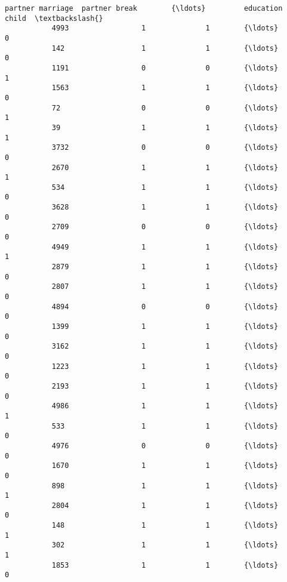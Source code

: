 \documentclass[11pt]{article}
\begin{document}
\begin{Verbatim}[commandchars=\\\{\}]
                 partner marriage  partner break        {\ldots}         education child  \textbackslash{}
           4993                 1              1        {\ldots}                       0   
           142                  1              1        {\ldots}                       0   
           1191                 0              0        {\ldots}                       1   
           1563                 1              1        {\ldots}                       0   
           72                   0              0        {\ldots}                       1   
           39                   1              1        {\ldots}                       1   
           3732                 0              0        {\ldots}                       0   
           2670                 1              1        {\ldots}                       1   
           534                  1              1        {\ldots}                       0   
           3628                 1              1        {\ldots}                       0   
           2709                 0              0        {\ldots}                       0   
           4949                 1              1        {\ldots}                       1   
           2879                 1              1        {\ldots}                       0   
           2807                 1              1        {\ldots}                       0   
           4894                 0              0        {\ldots}                       0   
           1399                 1              1        {\ldots}                       0   
           3162                 1              1        {\ldots}                       0   
           1223                 1              1        {\ldots}                       0   
           2193                 1              1        {\ldots}                       0   
           4986                 1              1        {\ldots}                       1   
           533                  1              1        {\ldots}                       0   
           4976                 0              0        {\ldots}                       0   
           1670                 1              1        {\ldots}                       0   
           898                  1              1        {\ldots}                       1   
           2804                 1              1        {\ldots}                       0   
           148                  1              1        {\ldots}                       1   
           302                  1              1        {\ldots}                       1   
           1853                 1              1        {\ldots}                       0   

\end{Verbatim}
\end{document}
